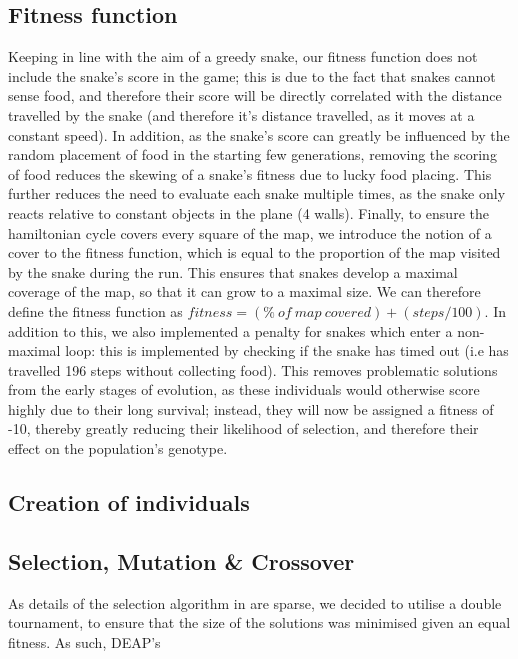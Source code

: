 \documentclass[british,10pt,a4paper]{article}
\begin{document}
\subsection{Fitness function}
Keeping in line with the aim of a greedy snake, our fitness function does not include the snake's score in the game; this is due to the fact that snakes cannot sense food, and therefore their score will be directly correlated with the distance travelled by the snake (and therefore it's distance travelled, as it moves at a constant speed). In addition, as the snake's score can greatly be influenced by the random placement of food in the starting few generations, removing the scoring of food reduces the skewing of a snake's fitness due to lucky food placing. This further reduces the need to evaluate each snake multiple times, as the snake only reacts relative to constant objects in the plane (4 walls). Finally, to ensure the hamiltonian cycle covers every square of the map, we introduce the notion of a cover to the fitness function, which is equal to the proportion of the map visited by the snake during the run. This ensures that snakes develop a maximal coverage of the map, so that it can grow to a maximal size. \newline
We can therefore define the fitness function as \(fitness= (\% \ of\ map\ covered) + (steps/100)\). \newline
In addition to this, we also implemented a penalty for snakes which enter a non-maximal loop: this is implemented by checking if the snake has timed out (i.e has travelled 196 steps without collecting food). This removes problematic solutions from the early stages of evolution, as these individuals would otherwise score highly due to their long survival; instead, they will now be assigned a fitness of -10, thereby greatly reducing their likelihood of selection, and therefore their effect on the population's genotype.

\subsection{Creation of individuals}
\subsection{Selection, Mutation \& Crossover}
As details of the selection algorithm in \cite{Ehlis2000-sz} are sparse, we decided to utilise a double tournament, to ensure that the size of the solutions was minimised given an equal fitness. As such, DEAP's 
\end{document}
